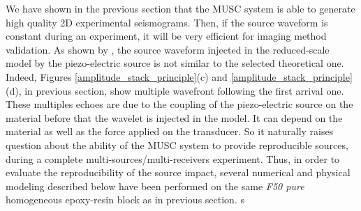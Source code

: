 \documentclass[manuscript,revised]{geophysics}
\begin{document}
\noindent We have shown in the previous section that the MUSC system is able to generate high quality 2D experimental seismograms. Then, if the source waveform is constant during an experiment, it will be very efficient for imaging method validation. As shown by \citet{Bretaudeau_SSM_2011}, the source waveform injected in the reduced-scale model by the piezo-electric source is not similar to the selected theoretical one. Indeed, Figures \ref{amplitude_stack_principle}(c) and \ref{amplitude_stack_principle}(d), in previous section, show multiple wavefront following the first arrival one. These multiples echoes are due to the coupling of the piezo-electric source on the material before that the wavelet is injected in the model. It can depend on the material as well as the force applied on the transducer. So it naturally raises question about the ability of the MUSC system to provide reproducible sources, during a complete multi-sources/multi-receivers experiment. Thus, in order to evaluate the reproducibility of the source impact, several numerical and physical modeling described below have been performed on the same \textit{F50 pure} homogeneous epoxy-resin block as in previous section. s
\end{document}
